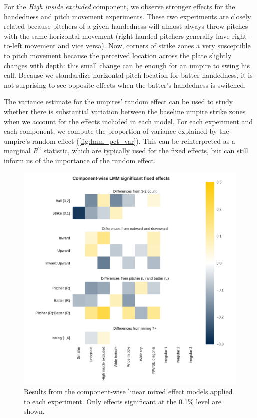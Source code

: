 \documentclass[letterpaper,12pt]{article}
\begin{document}
For the \textit{High inside excluded} component, we observe stronger effects for the handedness and pitch movement experiments. These two experiments are closely related because pitchers of a given handedness will almost always throw pitches with the same horizontal movement (right-handed pitchers generally have right-to-left movement and vice versa).
Now, corners of strike zones a very susceptible to pitch movement because the perceived location across the plate slightly changes with depth: this small change can be enough for an umpire to swing his call. 
Because we standardize horizontal pitch location for batter handedness, it is not surprising to see opposite effects when the batter's handedness is switched.

The variance estimate for the umpires' random effect can be used to study whether there is substantial variation between the baseline umpire strike zones when we account for the effects included in each model. 
For each experiment and each component, we compute the proportion of variance explained by the umpire's random effect (\cref{fig:lmm_pct_var}). This can be reinterpreted as a marginal $R^2$ statistic, which are typically used for the fixed effects, but can still inform us of the importance of the random effect.

\begin{figure}[t!]
    \centering
    \includegraphics[scale=0.7]{fig/lmm_effects.pdf}
    \caption{Results from the component-wise linear mixed effect models applied to each experiment. Only effects significant at the 0.1\% level are shown.}
    \label{fig:ols_effects}
\end{figure}
\end{document}
